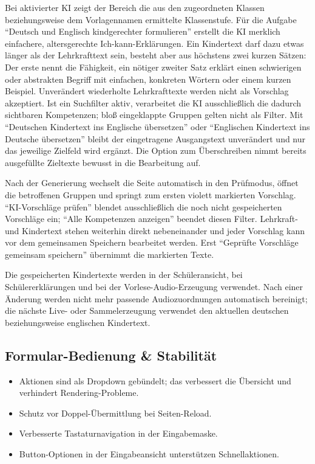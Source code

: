 \documentclass[12pt,a4paper]{article}
\begin{document}
Bei aktivierter KI zeigt der Bereich die aus den zugeordneten Klassen beziehungsweise dem Vorlagennamen ermittelte Klassenstufe. Für die Aufgabe \enquote{Deutsch und Englisch kindgerechter formulieren} erstellt die KI merklich einfachere, altersgerechte Ich-kann-Erklärungen. Ein Kindertext darf dazu etwas länger als der Lehrkrafttext sein, besteht aber aus höchstens zwei kurzen Sätzen: Der erste nennt die Fähigkeit, ein nötiger zweiter Satz erklärt einen schwierigen oder abstrakten Begriff mit einfachen, konkreten Wörtern oder einem kurzen Beispiel. Unverändert wiederholte Lehrkrafttexte werden nicht als Vorschlag akzeptiert. Ist ein Suchfilter aktiv, verarbeitet die KI ausschließlich die dadurch sichtbaren Kompetenzen; bloß eingeklappte Gruppen gelten nicht als Filter. Mit \enquote{Deutschen Kindertext ins Englische übersetzen} oder \enquote{Englischen Kindertext ins Deutsche übersetzen} bleibt der eingetragene Ausgangstext unverändert und nur das jeweilige Zielfeld wird ergänzt. Die Option zum Überschreiben nimmt bereits ausgefüllte Zieltexte bewusst in die Bearbeitung auf.

Nach der Generierung wechselt die Seite automatisch in den Prüfmodus, öffnet die betroffenen Gruppen und springt zum ersten violett markierten Vorschlag. \enquote{KI-Vorschläge prüfen} blendet ausschließlich die noch nicht gespeicherten Vorschläge ein; \enquote{Alle Kompetenzen anzeigen} beendet diesen Filter. Lehrkraft- und Kindertext stehen weiterhin direkt nebeneinander und jeder Vorschlag kann vor dem gemeinsamen Speichern bearbeitet werden. Erst \enquote{Geprüfte Vorschläge gemeinsam speichern} übernimmt die markierten Texte.

Die gespeicherten Kindertexte werden in der Schüleransicht, bei Schülererklärungen und bei der Vorlese-Audio-Erzeugung verwendet. Nach einer Änderung werden nicht mehr passende Audiozuordnungen automatisch bereinigt; die nächste Live- oder Sammelerzeugung verwendet den aktuellen deutschen beziehungsweise englischen Kindertext.

\subsection{Formular-Bedienung \& Stabilität}
\begin{itemize}
  \item Aktionen sind als Dropdown gebündelt; das verbessert die Übersicht und verhindert Rendering-Probleme.
  \item Schutz vor Doppel-Übermittlung bei Seiten-Reload.
  \item Verbesserte Tastaturnavigation in der Eingabemaske.
  \item Button-Optionen in der Eingabeansicht unterstützen Schnellaktionen.
\end{itemize}
\end{document}
